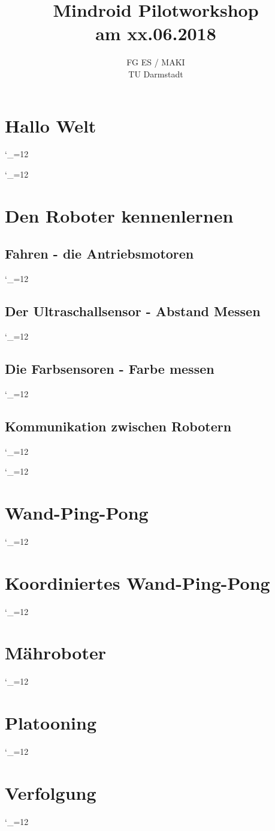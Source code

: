 \documentclass[
	12pt,
	article,
	type=bsc, %
	colorbacktitle,
	instlogo,
	accentcolor=tud1c,
	draft,
	german,
	solution,
	twoside
]{tudexercise}
\newcommand{\solpath}[0]{../../impl/androidApp/app/src/main/java/org/mindroid/android/app/programs/workshop/solutions}
\newcommand{\sol}{\begingroup
  \catcode`_=12 \docodelst}
\newcommand{\docodelst}[1]{
  	
  \endgroup
}
\begin{document}
	\author{}
	\title{Mindroid Pilotworkshop \\ am xx.06.2018}
	\subtitle{FG ES / MAKI \\ TU Darmstadt}
	\subsubtitle{}
	
	\maketitle	
	
	\newpage
	\section{Hallo Welt}
	\sol{HelloWorld}
	\sol{HelloDate}
	
	\newpage
	\section{Den Roboter kennenlernen}	
		\subsection{Fahren - die Antriebsmotoren}	
			\sol{DriveSquare}
		
		\newpage	
		\subsection{Der Ultraschallsensor - Abstand Messen}	
			\sol{ParkingSensor}	
		
		\newpage	
		\subsection{Die Farbsensoren - Farbe messen}
			\sol{ColourTest}
		
		\newpage	
		\subsection{Kommunikation zwischen Robotern}
			\sol{HelloWorldPingB}
			\sol{HelloWorldPingR}
	
	\newpage
	\section{Wand-Ping-Pong}
		\sol{ImpSingleWallPingPong}
	
	\newpage	
	\section{Koordiniertes Wand-Ping-Pong}
		\sol{ImpCoordWallPingPong}
		
	\newpage	
	\section{Mähroboter}
		\sol{LawnMower}
	
	\newpage
	\section{Platooning}
		\sol{Platooning}

	\section{Verfolgung}
		\sol{Follow}
	
\end{document}
